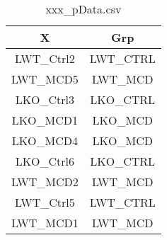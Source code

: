 \documentclass{article}
\begin{document}
\begin{table}[]
\centering
\caption{xxx\_pData.csv}
\label{my-label}
\begin{tabular}{|c|c|}
\hline
\textbf{X}  & \textbf{Grp} \\ \hline
LWT\_Ctrl2 & LWT\_CTRL    \\ \hline
LWT\_MCD5  & LWT\_MCD     \\ \hline
LKO\_Ctrl3 & LKO\_CTRL    \\ \hline
LKO\_MCD1  & LKO\_MCD     \\ \hline
LKO\_MCD4  & LKO\_MCD     \\ \hline
LKO\_Ctrl6 & LKO\_CTRL    \\ \hline
LWT\_MCD2  & LWT\_MCD     \\ \hline
LWT\_Ctrl5 & LWT\_CTRL    \\ \hline
LWT\_MCD1  & LWT\_MCD     \\ \hline
\end{tabular}
\end{table}
\end{document}
